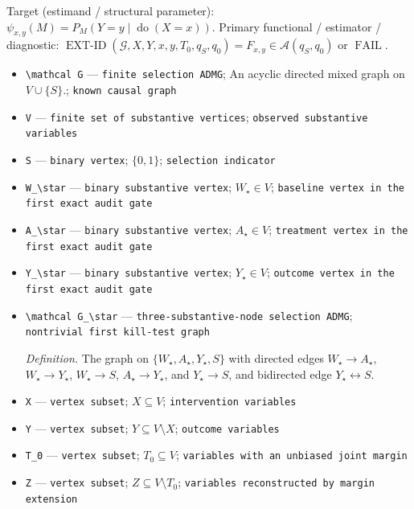 \documentclass{article}
\begin{document}
Target (estimand / structural parameter): \(\psi_{x,y}(M)=P_M(Y=y\mid\operatorname{do}(X=x))\).
Primary functional / estimator / diagnostic: \(\operatorname{EXT\text{-}ID}(\mathcal G,X,Y,x,y,T_0,q_S,q_0)=F_{x,y}\in\mathcal A(q_S,q_0)\) or \(\operatorname{FAIL}\).
\begin{itemize}
  \item \texttt{\textbackslash{}\allowbreak{}mathcal G} --- \texttt{finite selection ADMG}; An acyclic directed mixed graph on \(V\cup\{S\}\).; \texttt{known causal graph}
  \item \texttt{V} --- \texttt{finite set of substantive vertices}; \texttt{observed substantive variables}
  \item \texttt{S} --- \texttt{binary vertex}; \(\{0,1\}\); \texttt{selection indicator}
  \item \texttt{W\_\allowbreak{}\textbackslash{}\allowbreak{}star} --- \texttt{binary substantive vertex}; \(W_\star\in V\); \texttt{baseline vertex in the first exact audit gate}
  \item \texttt{A\_\allowbreak{}\textbackslash{}\allowbreak{}star} --- \texttt{binary substantive vertex}; \(A_\star\in V\); \texttt{treatment vertex in the first exact audit gate}
  \item \texttt{Y\_\allowbreak{}\textbackslash{}\allowbreak{}star} --- \texttt{binary substantive vertex}; \(Y_\star\in V\); \texttt{outcome vertex in the first exact audit gate}
  \item \texttt{\textbackslash{}\allowbreak{}mathcal G\_\allowbreak{}\textbackslash{}\allowbreak{}star} --- \texttt{three-\allowbreak{}substantive-\allowbreak{}node selection ADMG}; \texttt{nontrivial first kill-\allowbreak{}test graph}
  \par\smallskip\noindent\emph{Definition.} The graph on \(\{W_\star,A_\star,Y_\star,S\}\) with directed edges \(W_\star\to A_\star\), \(W_\star\to Y_\star\), \(W_\star\to S\), \(A_\star\to Y_\star\), and \(Y_\star\to S\), and bidirected edge \(Y_\star\leftrightarrow S\).
  \item \texttt{X} --- \texttt{vertex subset}; \(X\subseteq V\); \texttt{intervention variables}
  \item \texttt{Y} --- \texttt{vertex subset}; \(Y\subseteq V\setminus X\); \texttt{outcome variables}
  \item \texttt{T\_\allowbreak{}0} --- \texttt{vertex subset}; \(T_0\subseteq V\); \texttt{variables with an unbiased joint margin}
  \item \texttt{Z} --- \texttt{vertex subset}; \(Z\subseteq V\setminus T_0\); \texttt{variables reconstructed by margin extension}

\end{itemize}
\end{document}
